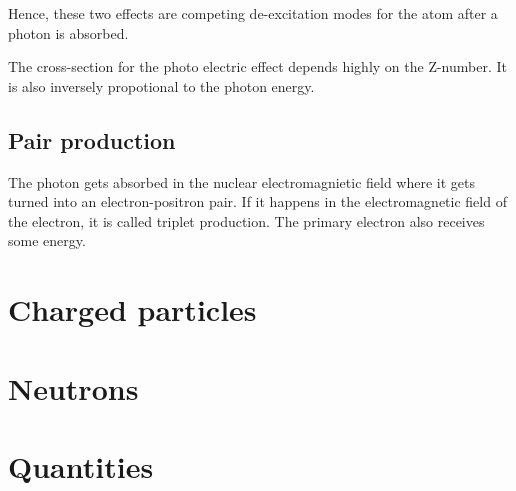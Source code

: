 \documentclass{article}
\begin{document}
Hence, these two effects are competing de-excitation modes for the atom after a photon is absorbed.

The cross-section for the photo electric effect depends highly on the Z-number.
It is also inversely propotional to the photon energy.

\subsection{Pair production}

The photon gets absorbed in the nuclear electromagnietic field where it gets turned into an electron-positron pair. 
If it happens in the electromagnetic field of the electron, it is called triplet production.
The primary electron also receives some energy.

\section{Charged particles}

\section{Neutrons}

\section{Quantities}
\end{document}
